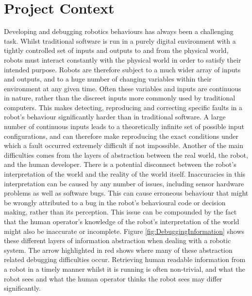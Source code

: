 
\section{Project Context} \label{ProjectContext}
Developing and debugging robotics behaviours has always been a challenging task. Whilst traditional software is run in a purely digital environment with a tightly controlled set of inputs and outputs to and from the physical world, robots must interact constantly with the physical world in order to satisfy their intended purpose. Robots are therefore subject to a much wider array of inputs and outputs, and to a huge number of changing variables within their environment at any given time. Often these variables and inputs are continuous in nature, rather than the discreet inputs more commonly used by traditional computers. This makes detecting, reproducing and correcting specific faults in a robot's behaviour significantly harder than in traditional software. A large number of continuous inputs leads to a theoretically infinite set of possible input configurations, and can therefore make reproducing the exact conditions under which a fault occurred extremely difficult if not impossible. Another of the main difficulties comes from the layers of abstraction between the real world, the robot, and the human developer. There is a potential disconnect between the robot's interpretation of the world and the reality of the world itself. Inaccuracies in this interpretation can be caused by any number of issues, including sensor hardware problems as well as software bugs. This can cause erroneous behaviour that might be wrongly attributed to a bug in the robot's behavioural code or decision making, rather than its perception. This issue can be compounded by the fact that the human operator's knowledge of the robot's interpretation of the world might also be inaccurate or incomplete. Figure \ref{fig:DebuggingInformation} shows these different layers of information abstraction when dealing with a robotic system. The arrow highlighted in red shows where many of these abstraction related debugging difficulties occur. Retrieving human readable information from a robot in a timely manner whilst it is running is often non-trivial, and what the robot sees and what the human operator thinks the robot sees may differ significantly.

